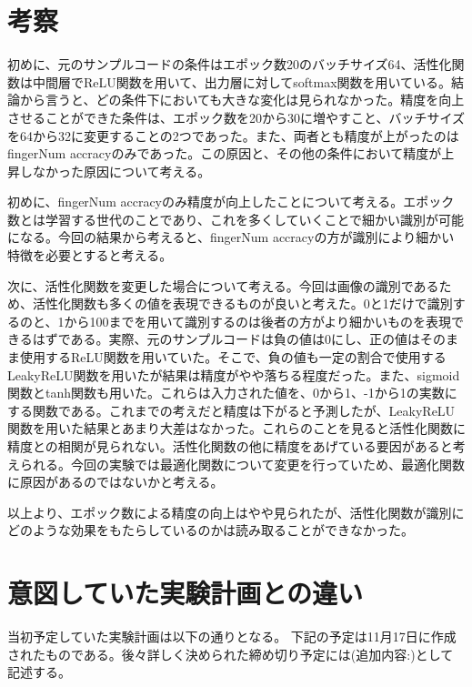 \documentclass[a4paper, 11pt, titlepage]{jsarticle}
\begin{document}
\section{考察}
初めに、元のサンプルコードの条件はエポック数20のバッチサイズ64、活性化関数は中間層でReLU関数を用いて、出力層に対してsoftmax関数を用いている。結論から言うと、どの条件下においても大きな変化は見られなかった。精度を向上させることができた条件は、エポック数を20から30に増やすこと、バッチサイズを64から32に変更することの2つであった。また、両者とも精度が上がったのは fingerNum accracyのみであった。この原因と、その他の条件において精度が上昇しなかった原因について考える。

初めに、fingerNum accracyのみ精度が向上したことについて考える。エポック数とは学習する世代のことであり、これを多くしていくことで細かい識別が可能になる。今回の結果から考えると、fingerNum accracyの方が識別により細かい特徴を必要とすると考える。

次に、活性化関数を変更した場合について考える。今回は画像の識別であるため、活性化関数も多くの値を表現できるものが良いと考えた。0と1だけで識別するのと、1から100までを用いて識別するのは後者の方がより細かいものを表現できるはずである。実際、元のサンプルコードは負の値は0にし、正の値はそのまま使用するReLU関数を用いていた。そこで、負の値も一定の割合で使用するLeakyReLU関数を用いたが結果は精度がやや落ちる程度だった。また、sigmoid関数とtanh関数も用いた。これらは入力された値を、0から1、-1から1の実数にする関数である。これまでの考えだと精度は下がると予測したが、LeakyReLU関数を用いた結果とあまり大差はなかった。これらのことを見ると活性化関数に精度との相関が見られない。活性化関数の他に精度をあげている要因があると考えられる。今回の実験では最適化関数について変更を行っていため、最適化関数に原因があるのではないかと考える。

以上より、エポック数による精度の向上はやや見られたが、活性化関数が識別にどのような効果をもたらしているのかは読み取ることができなかった。

\section{意図していた実験計画との違い}

当初予定していた実験計画は以下の通りとなる。
下記の予定は11月17日に作成されたものである。後々詳しく決められた締め切り予定には(追加内容:)として記述する。%
\end{document}
